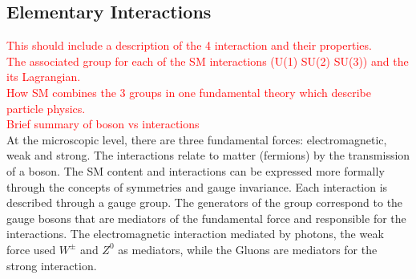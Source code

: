 \subsection{Elementary Interactions}
\label{chap1:SM:EI}
\textcolor{red}{This should include a description of the 4 interaction and their properties.\\
The associated group for each of the SM interactions (U(1) SU(2) SU(3)) and the its Lagrangian.\\
How SM combines the 3 groups in one fundamental theory which describe particle physics.\\
Brief summary of boson vs interactions
} \\
At the microscopic level, there are three fundamental forces: electromagnetic, weak and strong. The interactions relate to matter (fermions) by the transmission of a boson. The SM content and interactions can be expressed more formally through the concepts of symmetries and gauge invariance. Each interaction is described through a gauge group. The generators of the group correspond to the gauge bosons that are mediators of the fundamental force and responsible for the interactions. The electromagnetic interaction mediated by photons, the weak force used $W^{\pm}$ and $Z^{0}$ as mediators, while the Gluons are mediators for the strong interaction.
